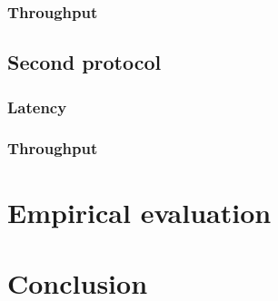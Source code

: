 \documentclass[a4paper]{article}
\begin{document}
\subsubsection*{Throughput}

\subsection*{Second protocol}

\subsubsection*{Latency}

\subsubsection*{Throughput}

\section*{Empirical evaluation}

\section*{Conclusion}
\end{document}
